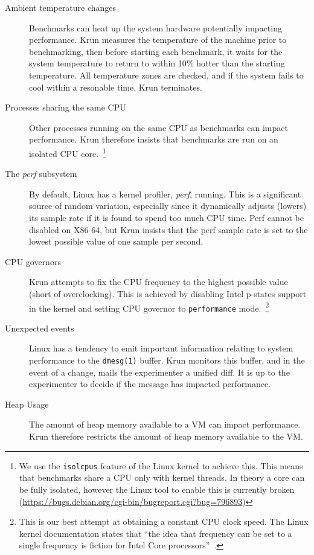 \documentclass[10pt,preprint]{sigplanconf}
\begin{document}
\begin{description}
\item[Ambient temperature changes] Benchmarks can heat up the system hardware
potentially impacting performance. Krun measures the temperature of the machine
prior to benchmarking, then before starting each benchmark, it waits for the
system temperature to return to within 10$\%$ hotter than the starting
temperature. All temperature zones are checked, and if the system fails to cool
within a resonable time, Krun terminates.\\
\item[Processes sharing the same CPU] Other processes running on the same CPU
as benchmarks can impact performance. Krun therefore insists that benchmarks
are run on an isolated CPU core.~\footnote{We use the \texttt{isolcpus} feature
of the Linux kernel to achieve this. This means that benchmarks share a CPU
only with kernel threads. In theory a core can be fully isolated, however the
Linux tool to enable this is currently broken
(\url{https://bugs.debian.org/cgi-bin/bugreport.cgi?bug=796893})}
\item[The \emph{perf} subsystem] By default, Linux has a kernel profiler,
\emph{perf}, running. This is a significant source of random variation,
especially since it dynamically adjusts (lowers) its sample rate if it is found
to spend too much CPU time. Perf cannot be disabled on X86-64, but Krun insists
that the perf sample rate is set to the lowest possible value of one sample per
second.
\item[CPU governors] Krun attempts to fix the CPU frequency to the highest
possible value (short of overclocking). This is achieved by disabling Intel
p-states support in the kernel and setting CPU governor to \texttt{performance}
mode.~\footnote{This is our best attempt at obtaining a constant CPU clock
speed. The Linux kernel documentation states that ``the idea that frequency can
be set to a single frequency is fiction for Intel Core
processors''~\cite{XXX}.}
\item[Unexpected events] Linux has a tendency to emit important information
relating to system performance to the \texttt{dmesg(1)} buffer. Krun monitors
this buffer, and in the event of a change, mails the experimenter a unified
diff. It is up to the experimenter to decide if the message has impacted
performance.
\item[Heap Usage] The amount of heap memory available to a VM can impact
performance. Krun therefore restricts the amount of heap memory available to
the VM.
\end{description}
\end{document}

